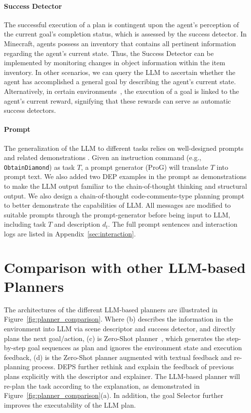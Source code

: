 \documentclass{article}
\begin{document}


\paragraph{Success Detector}

The successful execution of a plan is contingent upon the agent's perception of the current goal's completion status, which is assessed by the success detector. In Minecraft, agents possess an inventory that contains all pertinent information regarding the agent's current state. Thus, the Success Detector can be implemented by monitoring changes in object information within the item inventory. In other scenarios, we can query the LLM to ascertain whether the agent has accomplished a general goal by describing the agent's current state. Alternatively, in certain environments~\cite{clipport}, the execution of a goal is linked to the agent's current reward, signifying that these rewards can serve as automatic success detectors.

\paragraph{Prompt}
The generalization of the LLM to different tasks relies on well-designed prompts and related demonstrations \cite{min2022rethinking}. 
Given an instruction command (e.g., \texttt{ObtainDiamond}) as task $T$, a prompt generator (ProG) will translate $T$ into prompt text. We also added two DEP examples in the prompt as demonstrations to make the LLM output familiar to the chain-of-thought thinking and structural output.
We also design a chain-of-thought code-comments-type planning prompt to better demonstrate the capabilities of LLM.
All messages are modified to suitable prompts through the prompt-generator before being input to LLM, including task $T$ and description $d_t$.
The full prompt sentences and interaction logs are listed in Appendix~\ref{sec:interaction}.

\section{Comparison with other LLM-based Planners}\label{sec:planner_comparison}

The architectures of the different LLM-based planners are illustrated in Figure~\ref{fig:planner_comparison}. Where (b) describes the information in the environment into LLM via scene descriptor and success detector, and directly plans the next goal/action, (c) is Zero-Shot planner~\cite{huang2022language}, which generates the step-by-step goal sequences as plan and ignores the environment state and execution feedback, (d) is the Zero-Shot planner augmented with textual feedback and re-planning process.
DEPS further rethink and explain the feedback of previous plans explicitly with the descriptor and explainer. The LLM-based planner will re-plan the task according to the explanation, as demonstrated in Figure~\ref{fig:planner_comparison}(a).
In addition, the goal Selector further improves the executability of 
the LLM plan.
\end{document}
